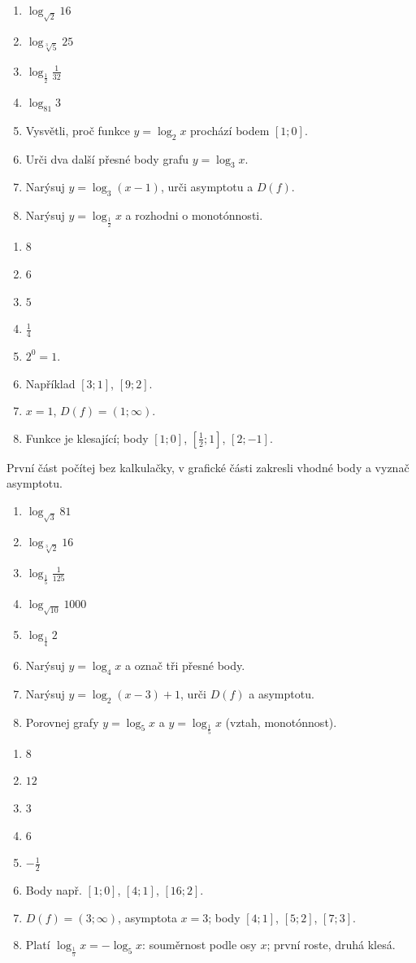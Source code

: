 \documentclass[11pt,a4paper]{article}
\begin{document}
\begin{zadaniReseniBox}[title={Samostatná práce 1}]
\begin{enumerate}[label=\alph*)]
\item $\log_{\sqrt2}16$
\item $\log_{\sqrt[3]5}25$
\item $\log_{\frac12}\frac1{32}$
\item $\log_{81}3$
\item Vysvětli, proč funkce $y=\log_2 x$ prochází bodem $[1;0]$.
\item Urči dva další přesné body grafu $y=\log_3x$.
\item Narýsuj $y=\log_3(x-1)$, urči asymptotu a $D(f)$.
\item Narýsuj $y=\log_{\frac12}x$ a rozhodni o monotónnosti.
\end{enumerate}
\tcblower
\begin{enumerate}[label=\alph*)]
\item $8$
\item $6$
\item $5$
\item $\frac14$
\item $2^0=1$.
\item Například $[3;1]$, $[9;2]$.
\item $x=1$, $D(f)=(1;\infty)$.
\item Funkce je klesající; body $[1;0]$, $[\frac12;1]$, $[2;-1]$.
\end{enumerate}
\end{zadaniReseniBox}
První část počítej bez kalkulačky, v grafické části zakresli vhodné body a vyznač asymptotu.
\begin{zadaniReseniBox}[title={Domácí úkol}]
\begin{enumerate}[label=\alph*)]
\item $\log_{\sqrt3}81$
\item $\log_{\sqrt[3]2}16$
\item $\log_{\frac15}\frac1{125}$
\item $\log_{\sqrt{10}}1000$
\item $\log_{\frac14}2$
\item Narýsuj $y=\log_4x$ a označ tři přesné body.
\item Narýsuj $y=\log_2(x-3)+1$, urči $D(f)$ a asymptotu.
\item Porovnej grafy $y=\log_5 x$ a $y=\log_{\frac15}x$ (vztah, monotónnost).
\end{enumerate}
\tcblower
\begin{enumerate}[label=\alph*)]
\item $8$
\item $12$
\item $3$
\item $6$
\item $-\frac12$
\item Body např. $[1;0]$, $[4;1]$, $[16;2]$.
\item $D(f)=(3;\infty)$, asymptota $x=3$; body $[4;1]$, $[5;2]$, $[7;3]$.
\item Platí $\log_{\frac15}x=-\log_5x$: souměrnost podle osy $x$; první roste, druhá klesá.
\end{enumerate}
\end{zadaniReseniBox}
\end{document}
